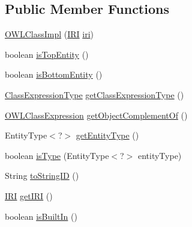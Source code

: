 \subsection*{Public Member Functions}
\begin{DoxyCompactItemize}
\item 
\hyperlink{classuk_1_1ac_1_1manchester_1_1cs_1_1owl_1_1owlapi_1_1_o_w_l_class_impl_a9028c51458b347ba00dc36839fe73081}{O\-W\-L\-Class\-Impl} (\hyperlink{classorg_1_1semanticweb_1_1owlapi_1_1model_1_1_i_r_i}{I\-R\-I} \hyperlink{classuk_1_1ac_1_1manchester_1_1cs_1_1owl_1_1owlapi_1_1_o_w_l_class_impl_a3e4de46ba2ab5b144c1b28f1d136a97e}{iri})
\item 
boolean \hyperlink{classuk_1_1ac_1_1manchester_1_1cs_1_1owl_1_1owlapi_1_1_o_w_l_class_impl_a9173e72ef5ebfec6c5848d453e1450e5}{is\-Top\-Entity} ()
\item 
boolean \hyperlink{classuk_1_1ac_1_1manchester_1_1cs_1_1owl_1_1owlapi_1_1_o_w_l_class_impl_aa0734a6331d5d36e985a1b0b50ab3556}{is\-Bottom\-Entity} ()
\item 
\hyperlink{enumorg_1_1semanticweb_1_1owlapi_1_1model_1_1_class_expression_type}{Class\-Expression\-Type} \hyperlink{classuk_1_1ac_1_1manchester_1_1cs_1_1owl_1_1owlapi_1_1_o_w_l_class_impl_afee27cae6016a6d303daa206b718c950}{get\-Class\-Expression\-Type} ()
\item 
\hyperlink{interfaceorg_1_1semanticweb_1_1owlapi_1_1model_1_1_o_w_l_class_expression}{O\-W\-L\-Class\-Expression} \hyperlink{classuk_1_1ac_1_1manchester_1_1cs_1_1owl_1_1owlapi_1_1_o_w_l_class_impl_a9585f274a0b1ed229976f3c0560a4b59}{get\-Object\-Complement\-Of} ()
\item 
Entity\-Type$<$?$>$ \hyperlink{classuk_1_1ac_1_1manchester_1_1cs_1_1owl_1_1owlapi_1_1_o_w_l_class_impl_a7378de74c9e246af6978c735fc0743e0}{get\-Entity\-Type} ()
\item 
boolean \hyperlink{classuk_1_1ac_1_1manchester_1_1cs_1_1owl_1_1owlapi_1_1_o_w_l_class_impl_a04ef369674c84591317294aaecbde8bb}{is\-Type} (Entity\-Type$<$?$>$ entity\-Type)
\item 
String \hyperlink{classuk_1_1ac_1_1manchester_1_1cs_1_1owl_1_1owlapi_1_1_o_w_l_class_impl_aa53cf2385a95477aa44fb171c7c1b784}{to\-String\-I\-D} ()
\item 
\hyperlink{classorg_1_1semanticweb_1_1owlapi_1_1model_1_1_i_r_i}{I\-R\-I} \hyperlink{classuk_1_1ac_1_1manchester_1_1cs_1_1owl_1_1owlapi_1_1_o_w_l_class_impl_af85c985432d3bf96fcfe78893f5e9845}{get\-I\-R\-I} ()
\item 
boolean \hyperlink{classuk_1_1ac_1_1manchester_1_1cs_1_1owl_1_1owlapi_1_1_o_w_l_class_impl_a53e3e978a8c9a0cb0b91e23b5fa0935e}{is\-Built\-In} ()

\end{DoxyCompactItemize}
